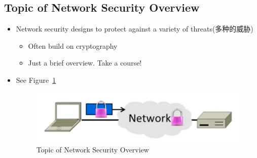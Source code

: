 \documentclass[12pt]{ctexart}   %
\begin{document}
	\subsection{Topic of Network Security Overview}
	\begin{itemize}
		\item Network security designs to protect against a variety of threats(多种的威胁)
		\begin{itemize}
			\item Often build on cryptography
			\item Just a brief overview. Take a course!
		\end{itemize}
		\item See Figure~\ref{fig:10-1-1}
		  
		\begin{figure}[h!] %
		\centering
		\includegraphics[scale=0.7]{images/10-1-1}
		\caption{Topic of Network Security Overview}
		\label{fig:10-1-1}
		\end{figure}
	\end{itemize}
\end{document}
